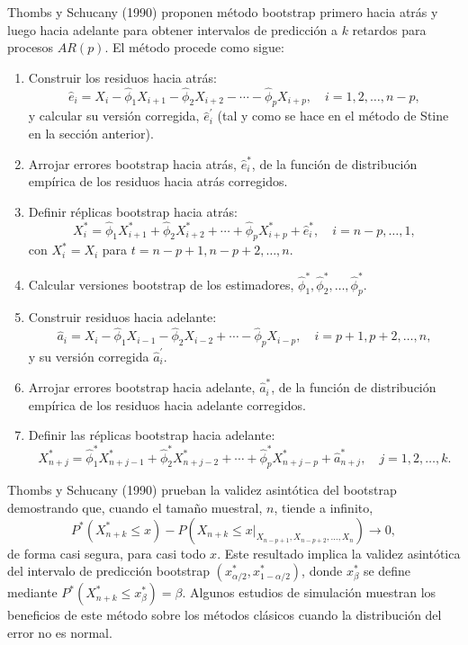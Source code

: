 \documentclass[]{book}
\theoremstyle{definition}
\theoremstyle{definition}
\theoremstyle{definition}
\theoremstyle{remark}
\begin{document}
Thombs y Schucany (1990) proponen método bootstrap primero hacia atrás y
luego hacia adelante para obtener intervalos de predicción a \(k\)
retardos para procesos \(AR(p)\). El método procede como sigue:

\begin{enumerate}
\def\labelenumi{\arabic{enumi}.}
\item
  Construir los residuos hacia
  atrás:\[\widehat{e}_i=X_i-\widehat{\phi}_1X_{i+1}-\widehat{\phi}
  _2X_{i+2}-\cdots -\widehat{\phi}_{p}X_{i+p},\quad i=1,2,\ldots ,n-p,\]y
  calcular su versión corregida, \(\widehat{e}_i^{\prime}\) (tal y como
  se hace en el método de Stine en la sección anterior).
\item
  Arrojar errores bootstrap hacia atrás, \(\widehat{e}_i^{\ast}\), de la
  función de distribución empírica de los residuos hacia atrás
  corregidos.
\item
  Definir réplicas bootstrap hacia
  atrás:\[X_i^{\ast}=\widehat{\phi}_1X_{i+1}^{\ast}+\widehat{\phi}
  _2X_{i+2}^{\ast}+\cdots +\widehat{\phi}_{p}X_{i+p}^{\ast}+\widehat{e}
  _i^{\ast},\quad i=n-p,\ldots ,1,\]con \(X_i^{\ast}=X_i\) para
  \(t=n-p+1,n-p+2,\ldots ,n\).
\item
  Calcular versiones bootstrap de los estimadores,
  \(\widehat{\phi} _1^{\ast},\widehat{\phi}_2^{\ast},\ldots ,\widehat{\phi}_{p}^{\ast}\).
\item
  Construir residuos hacia
  adelante:{\[\widehat{a}_i=X_i-\widehat{\phi}_1X_{i-1}-\widehat{\phi}
  _2X_{i-2}+\cdots -\widehat{\phi}_{p}X_{i-p},\quad i=p+1,p+2,\ldots ,n,\]}
  y su versión corregida \(\widehat{a}_i^{\prime}\).
\item
  Arrojar errores bootstrap hacia adelante, \(\widehat{a}_i^{\ast}\), de
  la función de distribución empírica de los residuos hacia adelante
  corregidos.
\item
  Definir las réplicas bootstrap hacia
  adelante:{\[X_{n+j}^{\ast}=\widehat{\phi}_1^{\ast}X_{n+j-1}^{\ast}+\widehat{\phi}
  _2^{\ast}X_{n+j-2}^{\ast}+\cdots +\widehat{\phi}_{p}^{\ast
  }X_{n+j-p}^{\ast}+\widehat{a}_{n+j}^{\ast},\quad j=1,2,\ldots ,k.\]}
\end{enumerate}

Thombs y Schucany (1990) prueban la validez asintótica del bootstrap
demostrando que, cuando el tamaño muestral, \(n\), tiende a infinito,
\[P^{\ast}\left( X_{n+k}^{\ast}\leq x \right) -P\left( X_{n+k}\leq
x|_{X_{n-p+1},X_{n-p+2},\ldots ,X_n} \right) \rightarrow 0,\]de forma
casi segura, para casi todo \(x\). Este resultado implica la validez
asintótica del intervalo de predicción bootstrap
\((x_{\alpha /2}^{\ast},x_{1-\alpha /2}^{\ast})\), donde
\(x_{\beta }^{\ast}\) se define mediante
\(P^{\ast}\left( X_{n+k}^{\ast}\leq x_{\beta }^{\ast} \right) =\beta\).
Algunos estudios de simulación muestran los beneficios de este método
sobre los métodos clásicos cuando la distribución del error no es
normal.
\end{document}
